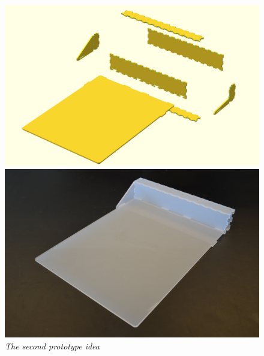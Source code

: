 \begin{figure}[h]
\begin{minipage}[b]{7.5cm}
\centering
\includegraphics[scale=0.235]{figures/iterations/v3.png}
\end{minipage}
\begin{minipage}[b]{7.5cm}
\centering
\includegraphics[scale=0.58]{figures/iterations/v3-photo.jpg}
\end{minipage}
\caption{\small {\it {The second prototype idea}}} \label{fig:v2}
\end{figure}


